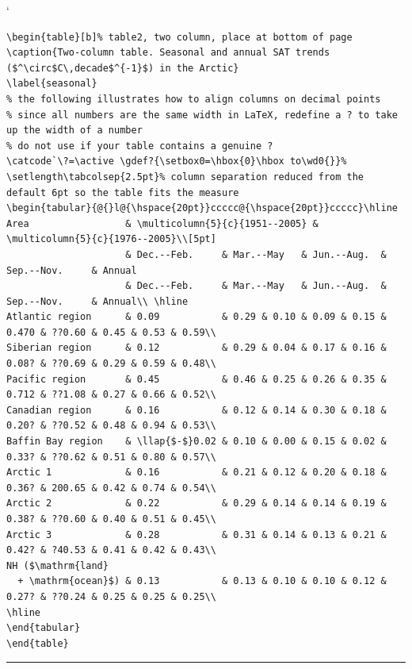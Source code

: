 \documentclass[twocolumn]{igs}
\begin{document}
\begin{table}[b]
\catcode`%
\vspace{0.25\baselineskip}
\begin{verbatim}
\begin{table}[b]% table2, two column, place at bottom of page
\caption{Two-column table. Seasonal and annual SAT trends ($^\circ$C\,decade$^{-1}$) in the Arctic}
\label{seasonal}
% the following illustrates how to align columns on decimal points
% since all numbers are the same width in LaTeX, redefine a ? to take up the width of a number
% do not use if your table contains a genuine ?
\catcode`\?=\active \gdef?{\setbox0=\hbox{0}\hbox to\wd0{}}%
\setlength\tabcolsep{2.5pt}% column separation reduced from the default 6pt so the table fits the measure
\begin{tabular}{@{}l@{\hspace{20pt}}ccccc@{\hspace{20pt}}ccccc}\hline
Area                 & \multicolumn{5}{c}{1951--2005} & \multicolumn{5}{c}{1976--2005}\\[5pt]
                     & Dec.--Feb.     & Mar.--May   & Jun.--Aug.  & Sep.--Nov.     & Annual
                     & Dec.--Feb.     & Mar.--May   & Jun.--Aug.  & Sep.--Nov.     & Annual\\ \hline
Atlantic region      & 0.09           & 0.29 & 0.10 & 0.09 & 0.15 & 0.470 & ??0.60 & 0.45 & 0.53 & 0.59\\
Siberian region      & 0.12           & 0.29 & 0.04 & 0.17 & 0.16 & 0.08? & ??0.69 & 0.29 & 0.59 & 0.48\\
Pacific region       & 0.45           & 0.46 & 0.25 & 0.26 & 0.35 & 0.712 & ??1.08 & 0.27 & 0.66 & 0.52\\
Canadian region      & 0.16           & 0.12 & 0.14 & 0.30 & 0.18 & 0.20? & ??0.52 & 0.48 & 0.94 & 0.53\\
Baffin Bay region    & \llap{$-$}0.02 & 0.10 & 0.00 & 0.15 & 0.02 & 0.33? & ??0.62 & 0.51 & 0.80 & 0.57\\
Arctic 1             & 0.16           & 0.21 & 0.12 & 0.20 & 0.18 & 0.36? & 200.65 & 0.42 & 0.74 & 0.54\\
Arctic 2             & 0.22           & 0.29 & 0.14 & 0.14 & 0.19 & 0.38? & ??0.60 & 0.40 & 0.51 & 0.45\\
Arctic 3             & 0.28           & 0.31 & 0.14 & 0.13 & 0.21 & 0.42? & ?40.53 & 0.41 & 0.42 & 0.43\\
NH ($\mathrm{land}
  + \mathrm{ocean}$) & 0.13           & 0.13 & 0.10 & 0.10 & 0.12 & 0.27? & ??0.24 & 0.25 & 0.25 & 0.25\\
\hline
\end{tabular}
\end{table}
\end{verbatim}
\vspace\baselineskip\hrule %
\end{table}
\end{document}
